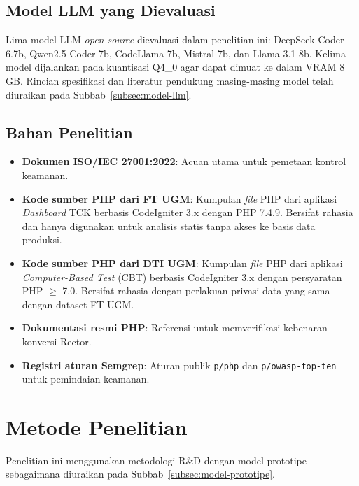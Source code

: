 \subsection{Model LLM yang Dievaluasi}

Lima model LLM \textit{open source} dievaluasi dalam penelitian 
ini: DeepSeek Coder 6.7b, Qwen2.5-Coder 7b, CodeLlama 7b, 
Mistral 7b, dan Llama 3.1 8b. Kelima model dijalankan pada 
kuantisasi Q4\_0 agar dapat dimuat ke dalam VRAM 8 GB. 
Rincian spesifikasi dan literatur pendukung masing-masing model 
telah diuraikan pada Subbab~\ref{subsec:model-llm}.
\subsection{Bahan Penelitian}

\begin{itemize}

    \item \textbf{Dokumen ISO/IEC 27001:2022}: Acuan utama untuk pemetaan kontrol keamanan.

    \item \textbf{Kode sumber PHP dari FT UGM}: Kumpulan \textit{file} PHP 
dari aplikasi \textit{Dashboard} TCK berbasis CodeIgniter 3.x dengan 
PHP 7.4.9. Bersifat rahasia dan hanya digunakan untuk analisis statis 
tanpa akses ke basis data produksi.

\item \textbf{Kode sumber PHP dari DTI UGM}: Kumpulan \textit{file} PHP 
dari aplikasi \textit{Computer-Based Test} (CBT) berbasis CodeIgniter 3.x 
dengan persyaratan PHP $\geq$ 7.0. Bersifat rahasia dengan perlakuan 
privasi data yang sama dengan dataset FT UGM.
    \item \textbf{Dokumentasi resmi PHP}: Referensi untuk memverifikasi kebenaran konversi Rector.

    \item \textbf{Registri aturan Semgrep}: Aturan publik \texttt{p/php} dan \texttt{p/owasp-top-ten} untuk pemindaian keamanan.

\end{itemize}

\section{Metode Penelitian}

Penelitian ini menggunakan metodologi R\&D dengan model 
prototipe sebagaimana diuraikan pada 
Subbab~\ref{subsec:model-prototipe}.

